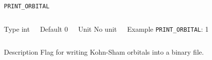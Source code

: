 \begin{frame}[allowframebreaks]{\texttt{PRINT\_ORBITAL}} \label{PRINT_ORBITAL}
\vspace*{-12pt}
\begin{columns}
\begin{block}{Type}
int
\end{block}

\begin{block}{Default}
0
\end{block}

\begin{block}{Unit}
No unit
\end{block}

\begin{block}{Example}
\texttt{PRINT\_ORBITAL}: 1
\end{block}
\end{columns}

\begin{block}{Description}
Flag for writing Kohn-Sham orbitals into a binary file. 
\end{block}


\end{frame}
